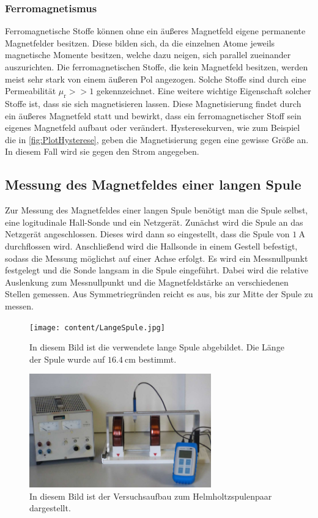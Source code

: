 \subsubsection{Ferromagnetismus}
\label{subsubsec:FERRO}
Ferromagnetische Stoffe können ohne ein äußeres Magnetfeld eigene permanente Magnetfelder besitzen. Diese bilden sich, da die einzelnen Atome jeweils magnetische Momente besitzen, welche 
dazu neigen, sich parallel zueinander auszurichten. Die ferromagnetischen Stoffe, die kein Magnetfeld besitzen, werden meist sehr stark von einem äußeren Pol angezogen. Solche Stoffe 
sind durch eine Permeabilität $\mu_{\text{r}} >> 1$ gekennzeichnet. Eine weitere wichtige Eigenschaft solcher Stoffe ist, dass sie sich magnetisieren lassen. Diese Magnetisierung findet
durch ein äußeres Magnetfeld statt und bewirkt, dass ein ferromagnetischer Stoff sein eigenes Magnetfeld aufbaut oder verändert. Hysteresekurven, wie zum Beispiel die in \autoref{fig:PlotHysterese},
geben die Magnetisierung gegen eine gewisse Größe an. In diesem Fall wird sie gegen den Strom angegeben.
\subsection{Messung des Magnetfeldes einer langen Spule}
\label{subsec:D_Lange_Spule}
Zur Messung des Magnetfeldes einer langen Spule benötigt man die Spule selbst, eine logitudinale Hall-Sonde und ein Netzgerät. Zunächst wird die Spule an das Netzgerät angeschlossen.
Dieses wird dann so eingestellt, dass die Spule von $1\: \unit{\ampere}$ durchflossen wird. Anschließend wird die Hallsonde in einem Gestell befestigt, sodass die Messung 
möglichst auf einer Achse erfolgt.
Es wird ein Messnullpunkt festgelegt und die Sonde langsam in die Spule eingeführt. Dabei wird die relative Auslenkung zum Messnullpunkt und die Magnetfeldstärke 
an verschiedenen Stellen gemessen. Aus Symmetriegründen reicht es aus, bis zur Mitte der Spule zu messen.
\begin{figure}
    \centering
    \caption{In diesem Bild ist die verwendete lange Spule abgebildet. Die Länge der Spule wurde auf $16.4 \: \unit{\centi\metre}$ bestimmt.}
    \label{fig:Aufbau_lange_Spule}
    \texttt{[image: content/LangeSpule.jpg]}
\end{figure}

\begin{figure}[H]
    \centering
    \caption{In diesem Bild ist der Versuchsaufbau zum Helmholtzspulenpaar dargestellt.\cite{v308}}
    \label{fig:Aufbau_Spulenpaar}
    \includegraphics[width=0.7\textwidth]{content/HelmHoltzAufbau.PNG}
\end{figure}

